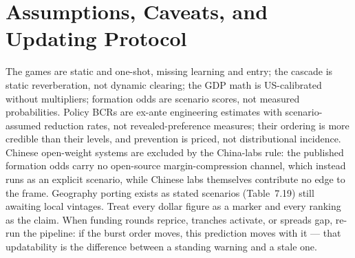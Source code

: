 \documentclass[11pt,a4paper]{article}
\begin{document}
\section{Assumptions, Caveats, and Updating Protocol}\label{sec:appendix-assumptions}\label{sec:limits}
The games are static and one-shot, missing learning and entry; the cascade
is static reverberation, not dynamic clearing; the GDP math is
US-calibrated without multipliers; formation odds are scenario scores, not
measured probabilities.
Policy BCRs are ex-ante engineering estimates with scenario-assumed
reduction rates, not revealed-preference measures; their ordering is more
credible than their levels, and prevention is priced, not distributional
incidence. Chinese open-weight systems are excluded by the China-labs rule:
the published formation odds carry no open-source margin-compression
channel, which instead runs as an explicit scenario, while Chinese labs
themselves contribute no edge to the frame. Geography porting exists as
stated scenarios (Table~7.19) still awaiting local vintages. Treat every
dollar figure as a marker and every ranking as the claim. When
funding rounds reprice, tranches activate, or spreads gap, re-run the
pipeline: if the burst order moves, this prediction moves with it --- that
updatability is the difference between a standing warning and a stale one.
\end{document}
